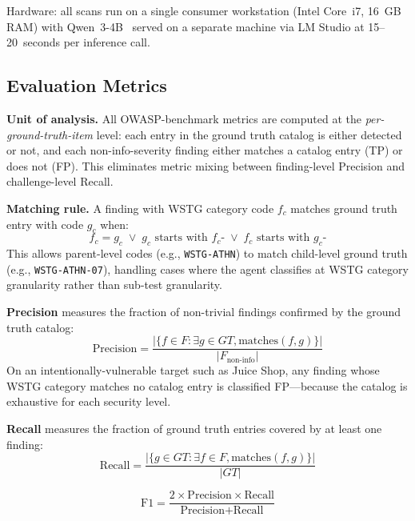 \documentclass[conference]{IEEEtran}
\begin{document}
Hardware: all scans run on a single consumer workstation (Intel
Core~i7, 16~GB RAM) with Qwen~3-4B~\cite{qwen3} served on a
separate machine via LM Studio at 15--20~seconds per inference call.

\subsection{Evaluation Metrics}

\textbf{Unit of analysis.} All OWASP-benchmark metrics are
computed at the \textit{per-ground-truth-item} level: each entry
in the ground truth catalog is either detected or not, and each
non-info-severity finding either matches a catalog entry (TP) or
does not (FP). This eliminates metric mixing between
finding-level Precision and challenge-level Recall.

\textbf{Matching rule.} A finding with WSTG category code $f_c$
matches ground truth entry with code $g_c$ when:
\begin{equation}
f_c = g_c \;\vee\; g_c \text{ starts with } f_c\text{-} \;\vee\; f_c \text{ starts with } g_c\text{-}
\label{eq:match}
\end{equation}
This allows parent-level codes (e.g., \texttt{WSTG-ATHN}) to
match child-level ground truth (e.g., \texttt{WSTG-ATHN-07}),
handling cases where the agent classifies at WSTG category
granularity rather than sub-test granularity.

\textbf{Precision} measures the fraction of non-trivial findings
confirmed by the ground truth catalog:
\begin{equation}
\text{Precision} = \frac{|\{f \in F : \exists g \in GT, \text{matches}(f,g)\}|}{|F_{\text{non-info}}|}
\label{eq:precision}
\end{equation}
On an intentionally-vulnerable target such as Juice Shop,
any finding whose WSTG category matches no catalog entry is
classified FP---because the catalog is exhaustive for each
security level.

\textbf{Recall} measures the fraction of ground truth entries
covered by at least one finding:
\begin{equation}
\text{Recall} = \frac{|\{g \in GT : \exists f \in F, \text{matches}(f,g)\}|}{|GT|}
\label{eq:recall}
\end{equation}

\begin{equation}
\text{F1} = \frac{2 \times \text{Precision} \times \text{Recall}}{\text{Precision} + \text{Recall}}
\label{eq:f1}
\end{equation}
\end{document}
